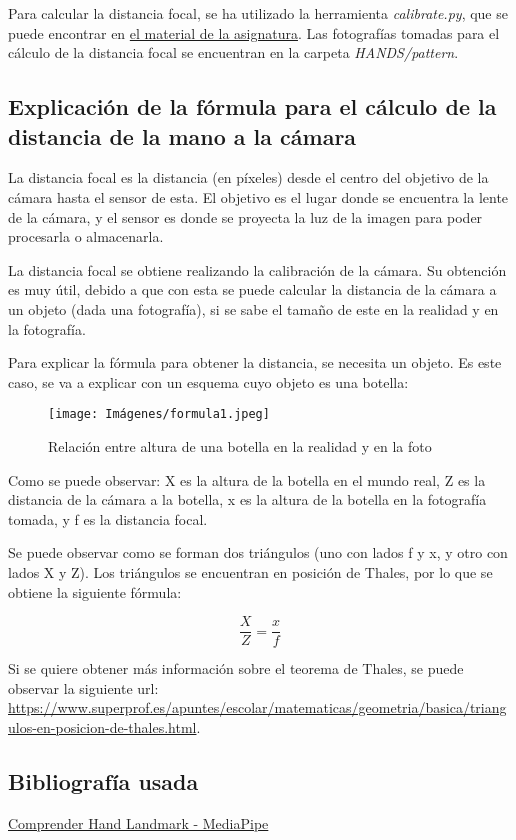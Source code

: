 \documentclass[12pt]{article}
\begin{document}
Para calcular la distancia focal, se ha utilizado la herramienta \textit{calibrate.py}, que se puede encontrar en \href{https://github.com/albertoruiz/umucv/tree/master/code/calibrate}{el material de la asignatura}. Las fotografías tomadas para el cálculo de la distancia focal se encuentran en la carpeta \textit{HANDS/pattern}.

\subsection*{Explicación de la fórmula para el cálculo de la distancia de la mano a la cámara}

La distancia focal es la distancia (en píxeles) desde el centro del objetivo de la cámara hasta el sensor de esta. El objetivo es el lugar donde se encuentra la lente de la cámara, y el sensor es donde se proyecta la luz de la imagen para poder procesarla o almacenarla.

La distancia focal se obtiene realizando la calibración de la cámara. Su obtención es muy útil, debido a que con esta se puede calcular la distancia de la cámara a un objeto (dada una fotografía), si se sabe el tamaño de este en la realidad y en la fotografía.

Para explicar la fórmula para obtener la distancia, se necesita un objeto. Es este caso, se va a explicar con un esquema cuyo objeto es una botella:

\begin{figure}[H]
    \centering
    \texttt{[image: Imágenes/formula1.jpeg]}
    \caption{Relación entre altura de una botella en la realidad y en la foto}
    \label{fig:semana2FOV}
\end{figure}

Como se puede observar: X es la altura de la botella en el mundo real, Z es la distancia de la cámara a la botella, x es la altura de la botella en la fotografía tomada, y f es la distancia focal.

Se puede observar como se forman dos triángulos (uno con lados f y x, y otro con lados X y Z). Los triángulos se encuentran en posición de Thales, por lo que se obtiene la siguiente fórmula:

$$\frac{X}{Z}=\frac{x}{f}$$

Si se quiere obtener más información sobre el teorema de Thales, se puede observar la siguiente url: \url{https://www.superprof.es/apuntes/escolar/matematicas/geometria/basica/triangulos-en-posicion-de-thales.html}.

\subsection*{Bibliografía usada}
\href{https://github.com/google/mediapipe/blob/master/docs/solutions/hands.md}{Comprender Hand Landmark - MediaPipe}
\end{document}
